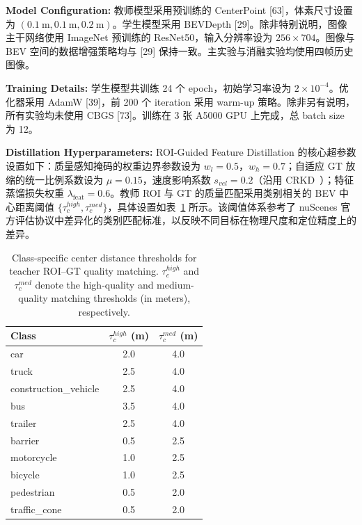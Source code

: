 \documentclass[12pt, UTF8]{ctexart}
\begin{document}
\vspace{0.5em} %
\noindent\textbf{Model Configuration:} 教师模型采用预训练的 CenterPoint [63]，体素尺寸设置为 $(0.1~\text{m}, 0.1~\text{m}, 0.2~\text{m})$。学生模型采用 BEVDepth [29]。除非特别说明，图像主干网络使用 ImageNet 预训练的 ResNet50，输入分辨率设为 $256\times704$。图像与 BEV 空间的数据增强策略均与 [29] 保持一致。主实验与消融实验均使用四帧历史图像。

\vspace{0.5em} %
\noindent\textbf{Training Details:}
学生模型共训练 24 个 epoch，初始学习率设为 $2\times10^{-4}$。优化器采用 AdamW [39]，前 200 个 iteration 采用 warm-up 策略。除非另有说明，所有实验均未使用 CBGS [73]。训练在 3 张 A5000 GPU 上完成，总 batch size 为 12。

\vspace{0.5em}
\noindent\textbf{Distillation Hyperparameters:}
ROI-Guided Feature Distillation 的核心超参数设置如下：质量感知掩码的权重边界参数设为 $w_l = 0.5$，$w_h = 0.7$；自适应 GT 放缩的统一比例系数设为 $\mu = 0.15$，速度影响系数 $s_{vel} = 0.2$（沿用 CRKD~\cite{Zhao_2024_CVPR}）；特征蒸馏损失权重 $\lambda_{\text{feat}} = 0.6$。教师 ROI 与 GT 的质量匹配采用类别相关的 BEV 中心距离阈值 $\{\tau^{high}_c, \tau^{med}_c\}$，具体设置如表~\ref{tab:thresholds} 所示。该阈值体系参考了 nuScenes 官方评估协议中差异化的类别匹配标准，以反映不同目标在物理尺度和定位精度上的差异。

\begin{table}[H]
\centering
\caption{Class-specific center distance thresholds for teacher ROI--GT quality matching. $\tau^{high}_c$ and $\tau^{med}_c$ denote the high-quality and medium-quality matching thresholds (in meters), respectively.}
\label{tab:thresholds}
\small
\vspace{2mm}
\begin{tabular}{lcc}
\toprule
Class & $\tau^{high}_c$ (m) & $\tau^{med}_c$ (m) \\
\midrule
car & 2.0 & 4.0 \\
truck & 2.5 & 4.0 \\
construction\_vehicle & 2.5 & 4.0 \\
bus & 3.5 & 4.0 \\
trailer & 2.5 & 4.0 \\
barrier & 0.5 & 2.5 \\
motorcycle & 1.0 & 2.5 \\
bicycle & 1.0 & 2.5 \\
pedestrian & 0.5 & 2.0 \\
traffic\_cone & 0.5 & 2.0 \\
\bottomrule
\end{tabular}
\end{table}
\end{document}
